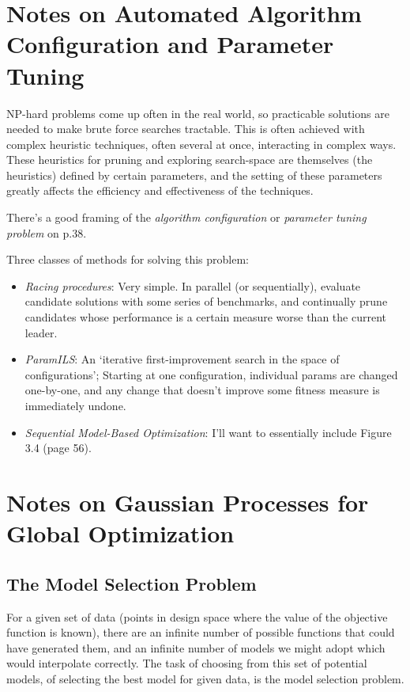 \documentclass[letterpaper]{article}
\begin{document}
\section{Notes on Automated Algorithm Configuration and Parameter Tuning}

NP-hard problems come up often in the real world, so practicable solutions are needed to make brute force searches tractable. This is often achieved with complex heuristic techniques, often several at once, interacting in complex ways. These heuristics for pruning and exploring search-space are themselves (the heuristics) defined by certain parameters, and the setting of these parameters greatly affects the efficiency and effectiveness of the techniques. 

There's a good framing of the \emph{algorithm configuration} or \emph{parameter tuning problem} on p.38.

Three classes of methods for solving this problem:

\begin{itemize}
\item \emph{Racing procedures}: Very simple. In parallel (or sequentially), evaluate candidate solutions with some series of benchmarks, and continually prune candidates whose performance is a certain measure worse than the current leader.
\item \emph{ParamILS}: An `iterative first-improvement search in the space of configurations'; Starting at one configuration, individual params are changed one-by-one, and any change that doesn't improve some fitness measure is immediately undone.
\item \emph{Sequential Model-Based Optimization}: I'll want to essentially include Figure 3.4 (page 56).
\end{itemize}

\section{Notes on Gaussian Processes for Global Optimization}
\subsection{The Model Selection Problem}
For a given set of data (points in design space where the value of the objective function is known), there are an infinite number of possible functions that could have generated them, and an infinite number of models we might adopt which would interpolate correctly. The task of choosing from this set of potential models, of selecting the best model for given data, is the model selection problem.
\end{document}
